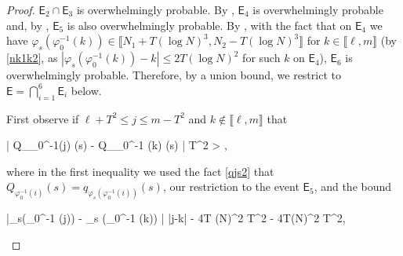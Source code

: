 \documentclass{amsart}
\numberwithin{equation}{section}
\theoremstyle{remark}
\theoremstyle{definition}
\begin{document}
\begin{proof}
			\noindent $\mathsf{E}_2 \cap \mathsf{E}_3$ is overwhelmingly probable. By , $\mathsf{E}_4$ is overwhelmingly probable and, by , $\mathsf{E}_5$ is also overwhelmingly probable. By , with the fact that on $\mathsf{E}_4$ we have $\varphi_s (\varphi_0^{-1} (k)) \in \llbracket N_1 + T(\log N)^3, N_2 - T(\log N)^3 \rrbracket$ for $k \in \llbracket \ell, m \rrbracket$ (by \eqref{nk1k2}, as $|\varphi_s (\varphi_0^{-1} (k)) - k| \le 2T (\log N)^2$ for such $k$ on $\mathsf{E}_4$), $\mathsf{E}_6$ is overwhelmingly probable. Therefore, by a union bound, we restrict to $\mathsf{E} = \bigcap_{i=1}^6 \mathsf{E}_i$ below.
			
			First observe if $\ell + T^2 \le j \le m - T^2$ and $k \notin \llbracket \ell, m \rrbracket$ that 
			\begin{flalign}
				\label{qjqk} 
				| Q_{\varphi_0^{-1}(j)} (s) - Q_{\varphi_0^{-1} (k)} (s) | \ge \displaystyle{} \cdot T^2  > ,
			\end{flalign}
			
			\noindent where in the first inequality we used the fact \eqref{qjs2} that $Q_{\varphi_0^{-1} (i)} (s) = q_{\varphi_s (\varphi_0^{-1} (i))} (s)$, our restriction to the event $\mathsf{E}_5$, and the bound 
			\begin{flalign*} 
				|\varphi_s(\varphi_0^{-1} (j)) - \varphi_s (\varphi_0^{-1} (k)) | \ge |j-k| - 4T (\log N)^2 \ge T^2 - 4T(\log N)^2 \ge \displaystyle{} \cdot T^2,
			\end{flalign*} 
			

\end{proof}
\end{document}
